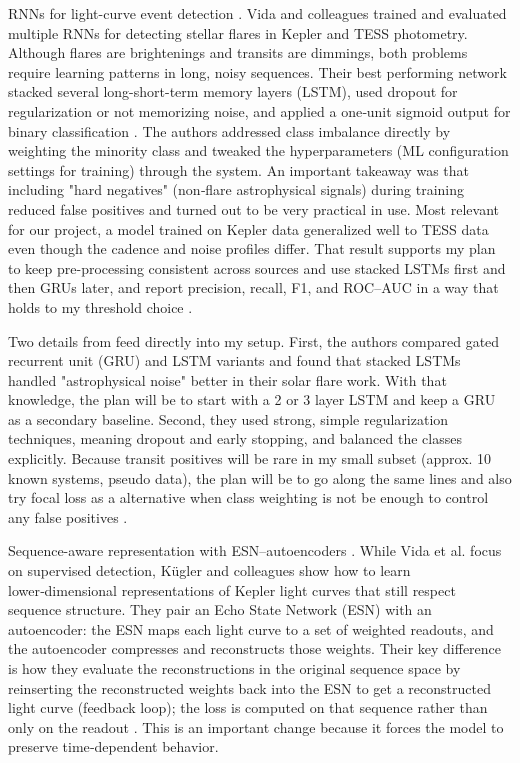 \documentclass[letterpaper]{article} %
\begin{document}
RNNs for light-curve event detection \cite{Vida2021findingflaresrecurrent}. Vida and colleagues trained and evaluated multiple RNNs for detecting stellar flares in Kepler and TESS photometry. Although flares are brightenings and transits are dimmings, both problems require learning patterns in long, noisy sequences. Their best performing network stacked several long-short-term memory layers (LSTM), used dropout for regularization or not memorizing noise, and applied a one‑unit sigmoid output for binary classification \cite{Vida2021findingflaresrecurrent}. The authors addressed class imbalance directly by weighting the minority class and tweaked the hyperparameters (ML configuration settings for training) through the system. An important takeaway was that including "hard negatives" (non‑flare astrophysical signals) during training reduced false positives and turned out to be very practical in use. Most relevant for our project, a model trained on Kepler data generalized well to TESS data even though the cadence and noise profiles differ. That result supports my plan to keep pre-processing consistent across sources and use stacked LSTMs first and then GRUs later, and report precision, recall, F1, and ROC–AUC in a way that holds to my threshold choice \cite{Vida2021findingflaresrecurrent}.

Two details from \cite{Vida2021findingflaresrecurrent} feed directly into my setup. First, the authors compared gated recurrent unit (GRU) and LSTM variants and found that stacked LSTMs handled "astrophysical noise" better in their solar flare work. With that knowledge, the plan will be to start with a 2 or 3 layer LSTM and keep a GRU as a secondary baseline. Second, they used strong, simple regularization techniques, meaning dropout and early stopping, and balanced the classes explicitly. Because transit positives will be rare in my small subset (approx. 10 known systems, pseudo data), the plan will be to go along the same lines and also try focal loss as a alternative when class weighting is not be enough to control any false positives \cite{Vida2021findingflaresrecurrent}.

Sequence-aware representation with ESN–autoencoders \cite{kugler2016explorativeapproachkepler}. While Vida et al. focus on supervised detection, Kügler and colleagues show how to learn lower‑dimensional representations of Kepler light curves that still respect sequence structure. They pair an Echo State Network (ESN) with an autoencoder: the ESN maps each light curve to a set of weighted readouts, and the autoencoder compresses and reconstructs those weights. Their key difference is how they evaluate the reconstructions in the original sequence space by reinserting the reconstructed weights back into the ESN to get a reconstructed light curve (feedback loop); the loss is computed on that sequence rather than only on the readout \cite{kugler2016explorativeapproachkepler}. This is an important change because it forces the model to preserve time‑dependent behavior.
\end{document}
